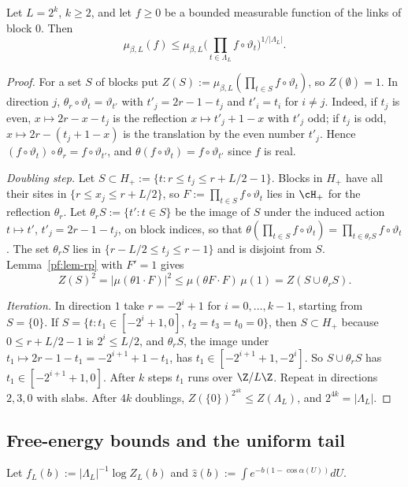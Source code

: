 \begin{lemma}\label{pf:lem-chess}
Let $L=2^k$, $k\ge2$, and let $f\ge0$ be a bounded measurable function of the links of block $0$. Then
\[
\mu_{\beta,L}(f)\le\mu_{\beta,L}\Big(\prod_{t\in\Lambda_L}f\circ\vartheta_t\Big)^{1/|\Lambda_L|}.
\]
\end{lemma}

\begin{proof}
For a set $S$ of blocks put $Z(S):=\mu_{\beta,L}(\prod_{t\in S}f\circ\vartheta_t)$, so $Z(\emptyset)=1$.
In direction $j$, $\theta_r\circ\vartheta_t=\vartheta_{t'}$ with $t'_j=2r-1-t_j$ and $t'_i=t_i$ for $i\ne j$. Indeed, if $t_j$ is even, $x\mapsto2r-x-t_j$ is the reflection $x\mapsto t'_j+1-x$ with $t'_j$ odd; if $t_j$ is odd, $x\mapsto2r-(t_j+1-x)$ is the translation by the even number $t'_j$. Hence $(f\circ\vartheta_t)\circ\theta_r=f\circ\vartheta_{t'}$, and $\theta(f\circ\vartheta_t)=f\circ\vartheta_{t'}$ since $f$ is real.

\emph{Doubling step.} Let $S\subset H_+:=\{t:r\le t_j\le r+L/2-1\}$. Blocks in $H_+$ have all their sites in $\{r\le x_j\le r+L/2\}$, so $F:=\prod_{t\in S}f\circ\vartheta_t$ lies in $\cH_+$ for the reflection $\theta_r$. Let $\theta_rS:=\{t':t\in S\}$ be the image of $S$ under the induced action $t\mapsto t'$, $t'_j=2r-1-t_j$, on block indices, so that $\theta(\prod_{t\in S}f\circ\vartheta_t)=\prod_{t\in\theta_rS}f\circ\vartheta_t$. The set $\theta_rS$ lies in $\{r-L/2\le t_j\le r-1\}$ and is disjoint from $S$. Lemma~\ref{pf:lem-rp} with $F'=1$ gives
\[
Z(S)^2=|\mu(\theta1\cdot F)|^2\le\mu(\theta F\cdot F)\,\mu(1)=Z(S\cup\theta_rS).
\]

\emph{Iteration.} In direction $1$ take $r=-2^i+1$ for $i=0,\dots,k-1$, starting from $S=\{0\}$. If $S=\{t:t_1\in[-2^i+1,0],\,t_2=t_3=t_0=0\}$, then $S\subset H_+$ because $0\le r+L/2-1$ is $2^i\le L/2$, and $\theta_rS$, the image under $t_1\mapsto2r-1-t_1=-2^{i+1}+1-t_1$, has $t_1\in[-2^{i+1}+1,-2^i]$. So $S\cup\theta_rS$ has $t_1\in[-2^{i+1}+1,0]$. After $k$ steps $t_1$ runs over $\Z/L\Z$. Repeat in directions $2,3,0$ with slabs. After $4k$ doublings, $Z(\{0\})^{2^{4k}}\le Z(\Lambda_L)$, and $2^{4k}=|\Lambda_L|$.
\end{proof}

\subsection{Free-energy bounds and the uniform tail}\label{pf:sec-free}

Let $f_L(b):=|\Lambda_L|^{-1}\log Z_L(b)$ and $\hat z(b):=\int e^{-b(1-\cos\alpha(U))}dU$.

